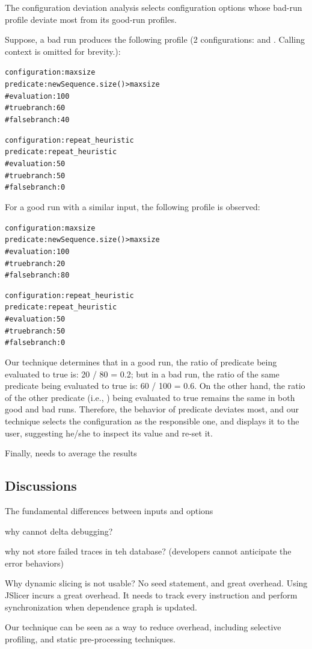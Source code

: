 The configuration deviation analysis selects configuration
options whose bad-run profile deviate most from its good-run profiles.

Suppose, a bad run produces the following profile (2 configurations: 
and . Calling context is omitted for brevity.):

\begin{CodeOut}
\begin{alltt}
configuration: maxsize 
predicate: newSequence.size() > maxsize
    \# evaluation: 100
    \# true branch: 60
    \# false branch: 40

configuration: repeat_heuristic
predicate: repeat_heuristic
    \# evaluation: 50
    \# true branch: 50
    \# false branch: 0
\end{alltt}
\end{CodeOut}

For a good run with a similar input, the following profile is observed:

\begin{CodeOut}
\begin{alltt}
configuration: maxsize 
predicate: newSequence.size() > maxsize
    \# evaluation: 100
    \# true branch: 20
    \# false branch: 80

configuration: repeat\_heuristic
predicate: repeat\_heuristic
    \# evaluation: 50
    \# true branch: 50
    \# false branch: 0
\end{alltt}
\end{CodeOut}

Our technique determines that in a good run, the ratio of predicate 
 being evaluated to true is: 20 / 80 = 0.2;
but in a bad run, the ratio of the same predicate being evaluated to true is: 60 / 100 = 0.6.
On the other hand, the ratio of the other predicate (i.e., ) being evaluated to true
remains the same in both good and bad runs. Therefore, the behavior
of predicate  deviates most, and our technique
selects the  configuration as the responsible one, and displays it to the user, suggesting he/she
to inspect its value and re-set it.


Finally, needs to average the results

\subsection{Discussions}

The fundamental differences between inputs and options

why cannot delta debugging?

why not store failed traces in teh database? (developers
cannot anticipate the error behaviors)

Why dynamic slicing is not usable? No seed statement, and great overhead. Using JSlicer incurs
a great overhead. It needs to track every instruction and
perform synchronization when dependence graph is updated.

Our technique can be seen as a way to reduce overhead,
including selective profiling, and static pre-processing
techniques.

